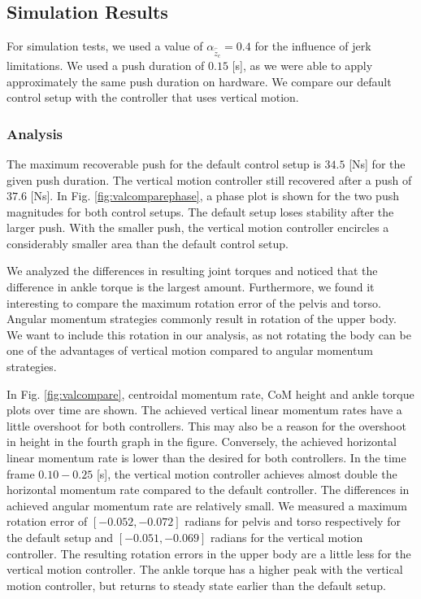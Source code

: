 \documentclass[letterpaper, 10 pt, conference]{ieeeconf}  %
\begin{document}
\subsection{Simulation Results}
For simulation tests, we used a value of $\alpha_{\hat{\ddot{z}}_{c}}=0.4$ for the influence of jerk limitations. We used a push duration of $0.15$ [s], as we were able to apply approximately the same push duration on hardware. We compare our default control setup with the controller that uses vertical motion. 

\subsubsection{Analysis}
The maximum recoverable push for the default control setup is $34.5$ [Ns] for the given push duration. The vertical motion controller still recovered after a push of $37.6$ [Ns]. In Fig. \ref{fig:valcomparephase}, a phase plot is shown for the two push magnitudes for both control setups. The default setup loses stability after the larger push. With the smaller push, the vertical motion controller encircles a considerably smaller area than the default control setup.

We analyzed the differences in resulting joint torques and noticed that the difference in ankle torque is the largest amount. Furthermore, we found it interesting to compare the maximum rotation error of the pelvis and torso. Angular momentum strategies commonly result in rotation of the upper body. We want to include this rotation in our analysis, as not rotating the body can be one of the advantages of vertical motion compared to angular momentum strategies.

In Fig. \ref{fig:valcompare}, centroidal momentum rate, CoM height and ankle torque plots over time are shown. The achieved vertical linear momentum rates have a little overshoot for both controllers. This may also be a reason for the overshoot in height in the fourth graph in the figure. Conversely, the achieved horizontal linear momentum rate is lower than the desired for both controllers. In the time frame $0.10-0.25$ [s], the vertical motion controller achieves almost double the horizontal momentum rate compared to the default controller. The differences in achieved angular momentum rate are relatively small. We measured a maximum rotation error of $[-0.052,-0.072]$ radians for pelvis and torso respectively for the default setup and $[-0.051,-0.069]$ radians for the vertical motion controller. The resulting rotation errors in the upper body are a little less for the vertical motion controller. The ankle torque has a higher peak with the vertical motion controller, but returns to steady state earlier than the default setup. 
\end{document}
